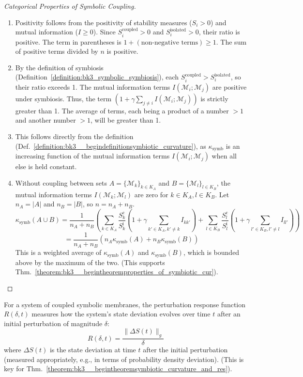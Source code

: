 \begin{proof}[Categorical Properties of Symbolic Coupling]
\label{proof:bk3_symbolic_coupling_properties_enumerated}
\begin{enumerate}
    \item Positivity follows from the positivity of stability measures ($S_i > 0$) and mutual information ($I \geq 0$). Since $S_i^{\text{coupled}} > 0$ and $S_i^{\text{isolated}} > 0$, their ratio is positive. The term in parentheses is $1 + (\text{non-negative terms}) \geq 1$. The sum of positive terms divided by $n$ is positive.
    \item By the definition of symbiosis (Definition~\ref{definition:bk3_symbolic_symbiosis}), each $S_i^{\text{coupled}} > S_i^{\text{isolated}}$, so their ratio exceeds 1. The mutual information terms $I(\mathcal{M}_i; \mathcal{M}_j)$ are positive under symbiosis. Thus, the term $\left(1 + \gamma \sum_{j \neq i} I(\mathcal{M}_i; \mathcal{M}_j)\right)$ is strictly greater than 1. The average of terms, each being a product of a number $>1$ and another number $>1$, will be greater than 1.
    \item This follows directly from the definition (Def.~\ref{definition:bk3__begindefinitionsymbiotic_curvature}), as $\kappa_{\text{symb}}$ is an increasing function of the mutual information terms $I(\mathcal{M}_i; \mathcal{M}_j)$ when all else is held constant.
    \item Without coupling between sets $A = \{\mathcal{M}_k\}_{k \in K_A}$ and $B = \{\mathcal{M}_l\}_{l \in K_B}$, the mutual information terms $I(\mathcal{M}_k; \mathcal{M}_l)$ are zero for $k \in K_A, l \in K_B$. Let $n_A = |A|$ and $n_B = |B|$, so $n = n_A + n_B$.
    \[
    \kappa_{\text{symb}}(A \cup B) = \frac{1}{n_A+n_B} \left( \sum_{k \in K_A} \frac{S_k^{\text{c}}}{S_k^{\text{i}}} (1 + \gamma \sum_{k' \in K_A, k' \neq k} I_{kk'}) + \sum_{l \in K_B} \frac{S_l^{\text{c}}}{S_l^{\text{i}}} (1 + \gamma \sum_{l' \in K_B, l' \neq l} I_{ll'}) \right)
    \]
    \[
    = \frac{1}{n_A+n_B} (n_A \kappa_{\text{symb}}(A) + n_B \kappa_{\text{symb}}(B))
    \]
    This is a weighted average of $\kappa_{\text{symb}}(A)$ and $\kappa_{\text{symb}}(B)$, which is bounded above by the maximum of the two. (This supports Thm.~\ref{theorem:bk3__begintheoremproperties_of_symbiotic_cur}).
\end{enumerate}
\end{proof}

\begin{definition} \label{definition:bk3__begindefinitionperturbation_response_fu}
For a system of coupled symbolic membranes, the perturbation response function $R(\delta, t)$ measures how the system's state deviation evolves over time $t$ after an initial perturbation of magnitude $\delta$:
\[
R(\delta, t) = \frac{\|\Delta S(t)\|_g}{\delta}
\]
where $\Delta S(t)$ is the state deviation at time $t$ after the initial perturbation (measured appropriately, e.g., in terms of probability density deviation). (This is key for Thm.~\ref{theorem:bk3__begintheoremsymbiotic_curvature_and_res}).
\end{definition}

